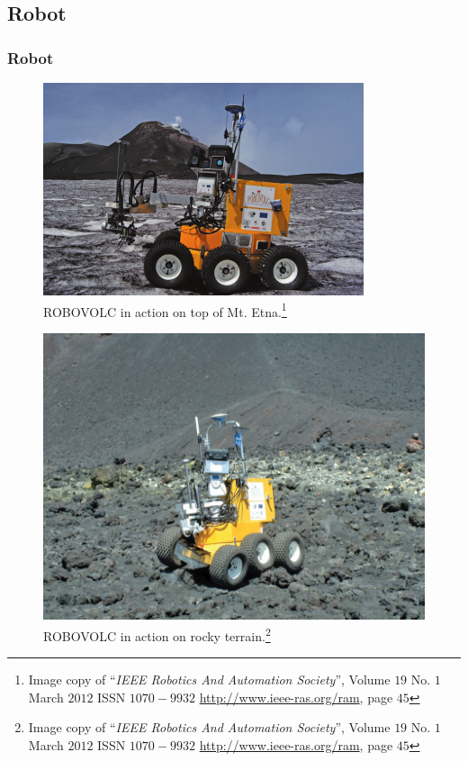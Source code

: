 \documentclass[xcolor=svgnames]{beamer}
\begin{document}
\subsection{Robot}
\begin{frame}
\frametitle{Robot}
    \begin{figure}[H]
	\centering
      \includegraphics[scale=0.9]{robovolc.png}
	\caption{ROBOVOLC in action on top of Mt. Etna.\footnote{Image copy of ``\textit{IEEE Robotics And Automation Society}'', Volume $19$ No. $1$ March $2012$ ISSN $1070-9932$ \url{http://www.ieee-ras.org/ram}, page $45$}}
      \label{fig9}
    \end{figure}
\end{frame}

\begin{frame}
    \begin{figure}[H]
	\centering
      \includegraphics[scale=0.5]{8.png}
	\caption{ROBOVOLC in action on rocky terrain.\footnote{Image copy of ``\textit{IEEE Robotics And Automation Society}'', Volume $19$ No. $1$ March $2012$ ISSN $1070-9932$ \url{http://www.ieee-ras.org/ram}, page $45$}}
      \label{fig25}
    \end{figure}
\end{frame}
\end{document}
